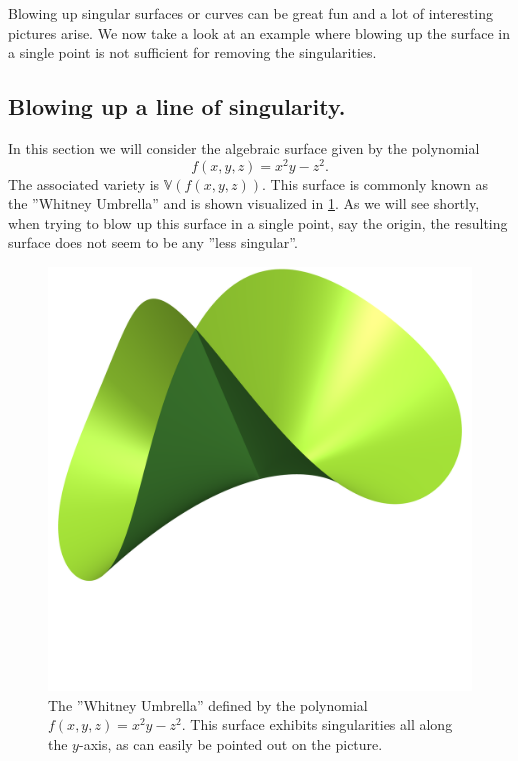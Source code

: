 \documentclass{article}
\newcommand{\V}{\ensuremath{\mathbb{V}}}
\begin{document}
    Blowing up singular surfaces or curves can be great fun and a lot of
    interesting pictures arise. We now take a look at an example where blowing
    up the surface in a single point is not sufficient for removing the
    singularities. 
    
    \subsection{Blowing up a line of singularity.}
    \label{sub:blowing_up_a_line_of_singularity_}
    
    In this section we will consider the algebraic surface given by the
    polynomial 
    \begin{equation}
        \label{eq:whitney}
        f(x, y, z) = x^2y - z^2.
    \end{equation}
    The associated variety is $\V(f(x, y, z))$. This surface is commonly known
    as the ''Whitney Umbrella'' and is shown visualized in
    \cref{fig:whitney_umbrella}. As we will see shortly, when trying to blow up
    this surface in a single point, say the origin, the resulting surface does
    not seem to be any ''less singular''.
   
    \begin{figure}[h]
        \centering
        \includegraphics[width=0.4\linewidth]{pictures/blowup_line.png}
        \caption{The ''Whitney Umbrella'' defined by the polynomial $f(x, y, z)
        = x^2y - z^2$. This surface exhibits singularities all along the
        $y$-axis, as can easily be pointed out on the picture.}
        \label{fig:whitney_umbrella}
    \end{figure}
\end{document}
